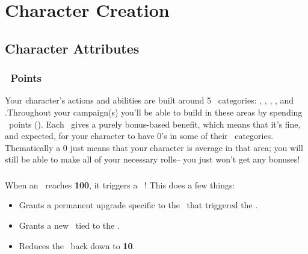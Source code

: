 
\part{Character Creation}

\chapter{Character Attributes}

\section{\attribute\ Points}

Your character's actions and abilities are built around 5 \attribute\ 
categories: \POWEful, \KNOWful, \ENDUful, \SPEDful, and \FOREful.Throughout
your campaign(s) you'll be able to build in these areas by spending
\attribute\ points (\attrval). Each \attribute\  gives a purely
bonus-based benefit, which means that it's fine, and expected, for
your character to have 0's in some of their \attribute\  categories.
Thematically a 0 just means that your character is average in that
area; you will still be able to make all of your necessary rolls--
you just won't get any bonuses! 


\section{\BURST{}}

When an \attribute\  reaches \textbf{100}, it triggers a \BURST\ !
This does a few things:
\begin{itemize}
\item Grants a permanent upgrade specific to the \attribute\ that triggered the \BURST.
\item Grants a new \techn\  tied to the \attribute.
\item Reduces the \attribute\  back down to \textbf{10}.
\end{itemize}


